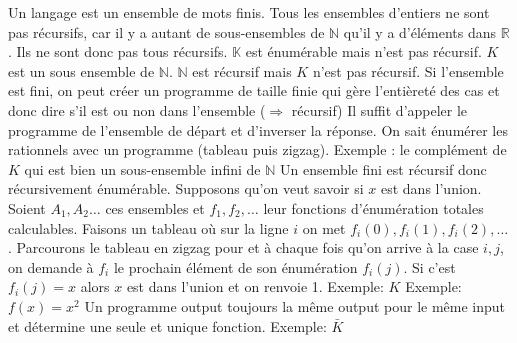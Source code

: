 \begin{mcqs}
  {Un langage est un ensemble de mots finis. Tous les ensembles d'entiers ne sont pas récursifs, car il y a autant de sous-ensembles de $\mathbb{N}$ qu'il y a d'éléments dans $\mathbb{R}$. Ils ne sont donc pas tous récursifs.}
  {$\mathbb{K}$ est énumérable mais n'est pas récursif.}
  {$K$ est un sous ensemble de $\mathbb{N}$. $\mathbb{N}$ est récursif mais $K$ n'est pas récursif.}
  {Si l'ensemble est fini, on peut créer un programme de taille finie qui gère l'entièreté des cas et donc dire s'il est ou non dans l'ensemble ($\Rightarrow$ récursif)}
  {Il suffit d'appeler le programme de l'ensemble de départ et d'inverser la réponse.}
  {On sait énumérer les rationnels avec un programme (tableau puis zigzag).}
  {Exemple : le complément de $K$ qui est bien un sous-ensemble infini de $\mathbb{N}$}
  {Un ensemble fini est récursif donc récursivement énumérable.}
  {Supposons qu'on veut savoir si $x$ est dans l'union.
   Soient $A_1, A_2 \ldots$ ces ensembles et $f_1, f_2, \ldots$ leur fonctions d'énumération totales calculables.
   Faisons un tableau où sur la ligne $i$ on met $f_i(0), f_i(1), f_i(2), \ldots$.
   Parcourons le tableau en zigzag pour et à chaque fois qu'on arrive à la case $i,j$, on demande à $f_i$ le prochain élément
   de son énumération $f_i(j)$.
   Si c'est $f_i(j) = x$ alors $x$ est dans l'union et on renvoie 1.}
  {Exemple: $K$}
  {Exemple: $f(x) = x^2$}
  {Un programme output toujours la même output pour le même input et détermine une seule et unique fonction.}
  {Exemple: $\bar{K}$}

\end{mcqs}
